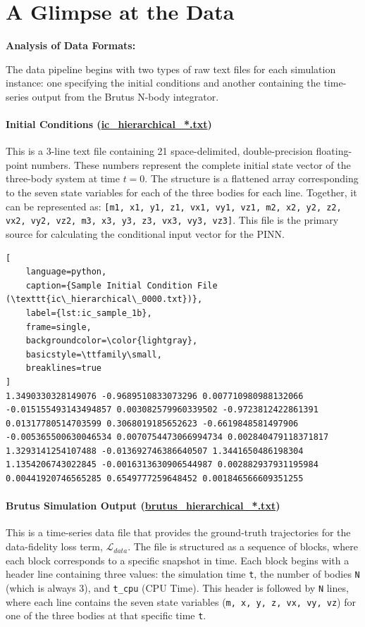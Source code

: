 \documentclass{article}
\begin{document}
\section{A Glimpse at the Data}



\textbf{Analysis of Data Formats:}

The data pipeline begins with two types of raw text files for each simulation instance: one specifying the initial conditions and another containing the time-series output from the Brutus N-body integrator.

\paragraph{Initial Conditions (\url{ic_hierarchical_*.txt})}
This is a 3-line text file containing 21 space-delimited, double-precision floating-point numbers. 
These numbers represent the complete initial state vector of the three-body system at time $t=0$. 
The structure is a flattened array corresponding to the seven state variables for each of the three bodies for each line. Together,
it can be represented as: 
\texttt{[m1, x1, y1, z1, vx1, vy1, vz1, m2, x2, y2, z2, vx2, vy2, vz2, m3, x3, y3, z3, vx3, vy3, vz3]}. 
This file is the primary source for calculating the conditional input vector for the PINN.

\begin{lstlisting}[
    language=python,
    caption={Sample Initial Condition File (\texttt{ic\_hierarchical\_0000.txt})},
    label={lst:ic_sample_1b},
    frame=single,
    backgroundcolor=\color{lightgray},
    basicstyle=\ttfamily\small,
    breaklines=true
]
1.3490330328149076 -0.9689510833073296 0.007710980988132066 -0.015155493143494857 0.003082579960339502 -0.9723812422861391 0.01317780514703599 0.3068019185652623 -0.6619848581497906 -0.005365500630046534 0.0070754473066994734 0.002840479118371817 1.3293141254107488 -0.013692746386640507 1.3441650486198304 1.1354206743022845 -0.0016313630906544987 0.002882937931195984 0.00441920746565285 0.6549777259648452 0.001846566609351255
\end{lstlisting}

\paragraph{Brutus Simulation Output (\url{brutus_hierarchical_*.txt})}
This is a time-series data file that provides the ground-truth 
trajectories for the data-fidelity loss term, $\mathcal{L}_{data}$. The file is structured as a sequence of blocks, 
where each block corresponds to a specific snapshot in time. Each block begins with a header line containing three values: 
the simulation time \texttt{t}, the number of bodies \texttt{N} (which is always 3), and \texttt{t\_cpu} (CPU Time). 
This header is followed by \texttt{N} lines, where each line contains the seven state variables 
(\texttt{m, x, y, z, vx, vy, vz}) for one of the three bodies at that specific time \texttt{t}.
\end{document}
